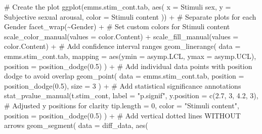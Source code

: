 \documentclass[
  bookmarksnumbered]{article}
\newenvironment{Shaded}{\begin{snugshade}}{\end{snugshade}}
\newcommand{\AttributeTok}[1]{\textcolor[rgb]{0.80,0.80,0.80}{#1}}
\newcommand{\CommentTok}[1]{\textcolor[rgb]{0.50,0.62,0.50}{#1}}
\newcommand{\DecValTok}[1]{\textcolor[rgb]{0.86,0.86,0.80}{#1}}
\newcommand{\FloatTok}[1]{\textcolor[rgb]{0.75,0.75,0.82}{#1}}
\newcommand{\FunctionTok}[1]{\textcolor[rgb]{0.94,0.94,0.56}{#1}}
\newcommand{\NormalTok}[1]{\textcolor[rgb]{0.80,0.80,0.80}{#1}}
\newcommand{\SpecialCharTok}[1]{\textcolor[rgb]{0.86,0.64,0.64}{#1}}
\newcommand{\StringTok}[1]{\textcolor[rgb]{0.80,0.58,0.58}{#1}}
\begin{document}
\begin{Shaded}
\begin{Highlighting}[]
\CommentTok{\# Create the plot}
\FunctionTok{ggplot}\NormalTok{(emms.stim\_cont.tab, }\FunctionTok{aes}\NormalTok{(}
  \AttributeTok{x =} \StringTok{\textasciigrave{}}\AttributeTok{Stimuli sex}\StringTok{\textasciigrave{}}\NormalTok{, }\AttributeTok{y =} \StringTok{\textasciigrave{}}\AttributeTok{Subjective sexual arousal}\StringTok{\textasciigrave{}}\NormalTok{,}
  \AttributeTok{color =} \StringTok{\textasciigrave{}}\AttributeTok{Stimuli content}\StringTok{\textasciigrave{}}
\NormalTok{)) }\SpecialCharTok{+}
  \CommentTok{\# Separate plots for each Gender}
  \FunctionTok{facet\_wrap}\NormalTok{(}\SpecialCharTok{\textasciitilde{}}\NormalTok{Gender) }\SpecialCharTok{+}
  \CommentTok{\# Set custom colors for Stimuli content}
  \FunctionTok{scale\_color\_manual}\NormalTok{(}\AttributeTok{values =}\NormalTok{ color.Content) }\SpecialCharTok{+}
  \FunctionTok{scale\_fill\_manual}\NormalTok{(}\AttributeTok{values =}\NormalTok{ color.Content) }\SpecialCharTok{+}
  \CommentTok{\# Add confidence interval ranges}
  \FunctionTok{geom\_linerange}\NormalTok{(}
    \AttributeTok{data =}\NormalTok{ emms.stim\_cont.tab,}
    \AttributeTok{mapping =} \FunctionTok{aes}\NormalTok{(}\AttributeTok{ymin =}\NormalTok{ asymp.LCL, }\AttributeTok{ymax =}\NormalTok{ asymp.UCL),}
    \AttributeTok{position =} \FunctionTok{position\_dodge}\NormalTok{(}\FloatTok{0.5}\NormalTok{)}
\NormalTok{  ) }\SpecialCharTok{+}
  \CommentTok{\# Add individual data points with position dodge to avoid overlap}
  \FunctionTok{geom\_point}\NormalTok{(}
    \AttributeTok{data =}\NormalTok{ emms.stim\_cont.tab,}
    \AttributeTok{position =} \FunctionTok{position\_dodge}\NormalTok{(}\FloatTok{0.5}\NormalTok{),}
    \AttributeTok{size =} \DecValTok{3}
\NormalTok{  ) }\SpecialCharTok{+}
  \CommentTok{\# Add statistical significance annotations}
  \FunctionTok{stat\_pvalue\_manual}\NormalTok{(t.stim\_cont,}
    \AttributeTok{label =} \StringTok{"p.signif"}\NormalTok{,}
    \AttributeTok{y.position =} \FunctionTok{c}\NormalTok{(}\FloatTok{2.7}\NormalTok{, }\DecValTok{3}\NormalTok{, }\FloatTok{4.2}\NormalTok{, }\DecValTok{3}\NormalTok{), }\CommentTok{\# Adjusted y positions for clarity}
    \AttributeTok{tip.length =} \DecValTok{0}\NormalTok{,}
    \AttributeTok{color =} \StringTok{"Stimuli content"}\NormalTok{,}
    \AttributeTok{position =} \FunctionTok{position\_dodge}\NormalTok{(}\FloatTok{0.5}\NormalTok{)}
\NormalTok{  ) }\SpecialCharTok{+}
  \CommentTok{\# Add vertical dotted lines WITHOUT arrows}
  \FunctionTok{geom\_segment}\NormalTok{(}
    \AttributeTok{data =}\NormalTok{ diff\_data,}
    \FunctionTok{aes}\NormalTok{(}

\end{Highlighting}
\end{Shaded}
\end{document}
